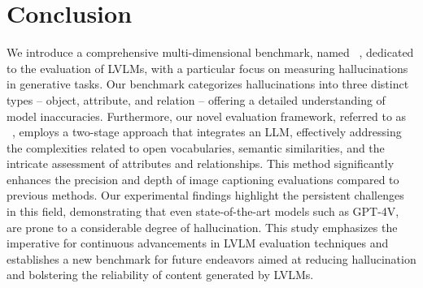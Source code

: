 \vspace{-2mm}
\section{Conclusion}
\vspace{-2mm}

We introduce a comprehensive multi-dimensional benchmark, named \data~, dedicated to the evaluation of LVLMs, with a particular focus on measuring hallucinations in generative tasks. Our benchmark categorizes hallucinations into three distinct types -- object, attribute, and relation -- offering a detailed understanding of model inaccuracies. Furthermore, our novel evaluation framework, referred to as \eval~, employs a two-stage approach that integrates an LLM, effectively addressing the complexities related to open vocabularies, semantic similarities, and the intricate assessment of attributes and relationships. This method significantly enhances the precision and depth of image captioning evaluations compared to previous methods. Our experimental findings highlight the persistent challenges in this field, demonstrating that even state-of-the-art models such as GPT-4V, are prone to a considerable degree of hallucination. This study emphasizes the imperative for continuous advancements in LVLM evaluation techniques and establishes a new benchmark for future endeavors aimed at reducing hallucination and bolstering the reliability of content generated by LVLMs.